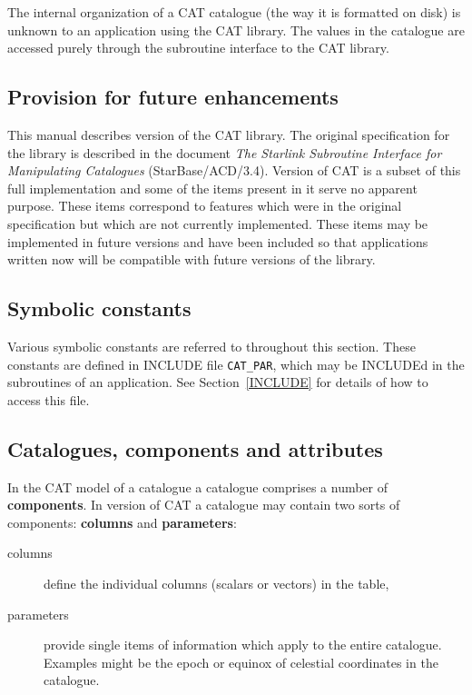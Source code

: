 The internal organization of a CAT catalogue (the way it is formatted
on disk) is unknown to an application using the CAT library. The values
in the catalogue are accessed purely through the subroutine interface to
the CAT library.


\subsection{Provision for future enhancements}

This manual describes version \CATversion of the CAT library.  The
original specification for the library is described in the document {\it
The Starlink Subroutine Interface for Manipulating Catalogues}
(StarBase/ACD/3.4)\cite{STARBASE34}.  Version \CATversion of CAT is a
subset of this full implementation and some of the items present in it
serve no apparent purpose.  These items correspond to features which were
in the original specification but which are not currently implemented.
These items may be implemented in future versions and have been included
so that applications written now will be compatible with future versions
of the library.

\subsection{Symbolic constants}

Various symbolic constants are referred to throughout this section.
These constants are defined in INCLUDE file {\tt CAT\_PAR}, which may
be INCLUDEd in the subroutines of an application. See
Section~\ref{INCLUDE} for details of how to access this file.


\subsection{\label{CCA}Catalogues, components and attributes}

In the CAT model of a catalogue a catalogue comprises a number of {\bf
components}. In version \CATversion of CAT a catalogue may contain
two sorts of components: {\bf columns} and {\bf parameters}:

\begin{description}

  \item[columns] define the individual columns (scalars or vectors) in
   the table,

  \item[parameters] provide single items of information which apply to
   the entire catalogue. Examples might be the epoch or equinox of
   celestial coordinates in the catalogue.


\end{description}

